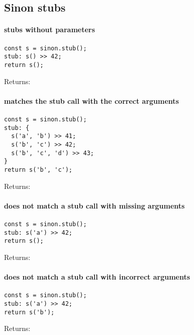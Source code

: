 \subsection*{Sinon stubs}

\paragraph*{stubs without parameters}
\begin{verbatim}
const s = sinon.stub();
stub: s() >> 42;
return s();
\end{verbatim}
Returns: 
\paragraph*{matches the stub call with the correct arguments}
\begin{verbatim}
const s = sinon.stub();
stub: {
  s('a', 'b') >> 41;
  s('b', 'c') >> 42;
  s('b', 'c', 'd') >> 43;
}
return s('b', 'c');
\end{verbatim}
Returns: 
\paragraph*{does not match a stub call with missing arguments}
\begin{verbatim}
const s = sinon.stub();
stub: s('a') >> 42;
return s();
\end{verbatim}
Returns: 
\paragraph*{does not match a stub call with incorrect arguments}
\begin{verbatim}
const s = sinon.stub();
stub: s('a') >> 42;
return s('b');
\end{verbatim}
Returns: 

